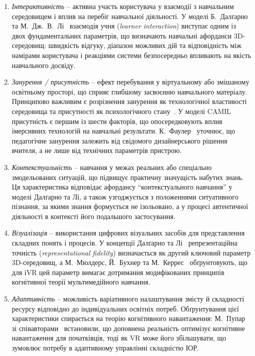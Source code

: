 \begin{enumerate}[label=\arabic*.]
	\item 
\emph{Інтерактивність} -- активна участь користувача у взаємодії з навчальним середовищем і вплив на перебіг навчальної діяльності. У моделі Б.~Далґарно та М.~Дж.~В.~Лі~\cite{Dalgarno2010What} взаємодія учня (\emph{learner interaction}) виступає одним із двох фундаментальних параметрів, що визначають навчальні афорданси 3D-середовищ: швидкість відгуку, діапазон можливих дій та відповідність між намірами користувача і реакціями системи безпосередньо впливають на якість навчального досвіду.

	\item 
\emph{Занурення / присутність} -- ефект перебування у віртуальному або змішаному освітньому просторі, що сприяє глибшому засвоєнню навчального матеріалу. Принципово важливим є розрізнення занурення як технологічної властивості середовища та присутності як психологічного стану~\cite{Semerikov2023Presence}. У моделі CAMIL~\cite{Makransky2021CAMIL} присутність є першим із шести факторів, що опосередковують вплив імерсивних технологій на навчальні результати. К.~Фаулер~\cite{Fowler2015Pedagogy} уточнює, що педагогічне занурення залежить від свідомого дизайнерського рішення вчителя, а не лише від технічних параметрів пристрою.

	\item 
\emph{Контекстуальність} -- навчання у межах реальних або спеціально змодельованих ситуацій, що підвищує практичну значущість набутих знань. Ця характеристика відповідає афордансу ``контекстуального навчання'' у моделі Далґарно та Лі, а також узгоджується з положеннями ситуативного пізнання, за якими знання формується не ізольовано, а у процесі автентичної діяльності в контексті його подальшого застосування.

	\item 
\emph{Візуалізація} -- використання цифрових візуальних засобів для представлення складних понять і процесів. У концепції Далґарно та Лі~\cite{Dalgarno2010What} репрезентаційна точність (\emph{representational fidelity}) визначається як другий ключовий параметр 3D-середовищ, а М.~Мюлдерс, Й.~Бухнер та М.~Керрес~\cite{Mulders2020Framework} обґрунтовують, що для іVR цей параметр вимагає дотримання модифікованих принципів когнітивної теорії мультимедійного навчання.

	\item 
\emph{Адаптивність} -- можливість варіативного налаштування змісту й складності ресурсу відповідно до індивідуальних освітніх потреб. Обґрунтування цієї характеристики спирається на теорію когнітивного навантаження: М.~Пупар зі співавторами~\cite{Poupard2024Systematic} встановили, що доповнена реальність оптимізує когнітивне навантаження для початківців, тоді як VR може його збільшувати, що зумовлює потребу в адаптивному управлінні складністю ІОР.
\end{enumerate}

